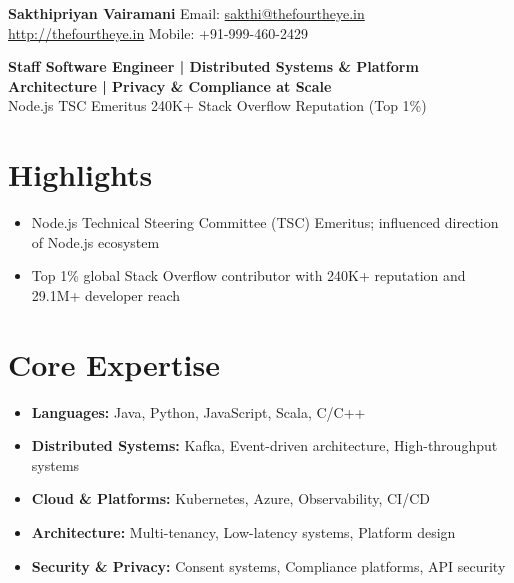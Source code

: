 \documentclass[letterpaper,11pt]{article}
\newcommand{\resumeItem}[1]{\item \small{#1}}
\begin{document}
\noindent
{\Large \textbf{Sakthipriyan Vairamani}} \hfill Email: \href{mailto:sakthi@thefourtheye.in}{sakthi@thefourtheye.in} \\
\href{http://thefourtheye.in}{http://thefourtheye.in} \hfill Mobile: +91-999-460-2429

\vspace{6pt}

\textbf{Staff Software Engineer | Distributed Systems \& Platform Architecture | Privacy \& Compliance at Scale} \\
Node.js TSC Emeritus \hfill 240K+ Stack Overflow Reputation (Top 1\%)

\section{Highlights}
\begin{itemize}[leftmargin=*]
  \resumeItem{Node.js Technical Steering Committee (TSC) Emeritus; influenced direction of Node.js ecosystem}
  \resumeItem{Top 1\% global Stack Overflow contributor with 240K+ reputation and 29.1M+ developer reach}
\end{itemize}

\section{Core Expertise}
\begin{itemize}[leftmargin=*]
  \resumeItem{\textbf{Languages:} Java, Python, JavaScript, Scala, C/C++}
  \resumeItem{\textbf{Distributed Systems:} Kafka, Event-driven architecture, High-throughput systems}
  \resumeItem{\textbf{Cloud \& Platforms:} Kubernetes, Azure, Observability, CI/CD}
  \resumeItem{\textbf{Architecture:} Multi-tenancy, Low-latency systems, Platform design}
  \resumeItem{\textbf{Security \& Privacy:} Consent systems, Compliance platforms, API security}
\end{itemize}

\end{document}
